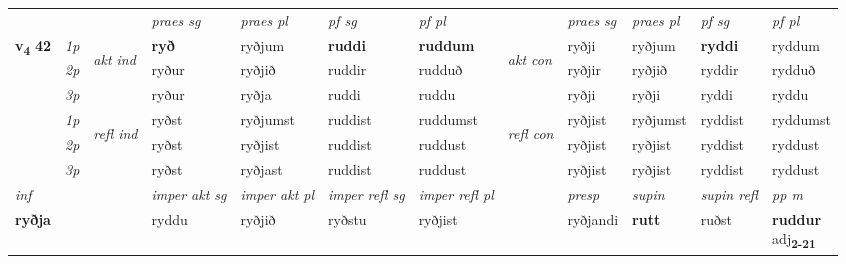 \begin{longtable}[l]{X>{\footnotesize\itshape}llXXXXlXXXX}
\midrule
 & &   & \textit{praes sg}  & \textit{praes pl}    & \textit{ pf sg} & \textit{pf pl} & & \textit{praes sg}  & \textit{praes pl}    & \textit{pf sg} & \textit{pf pl }  \\ \cmidrule{4-7} \cmidrule{9-12}
 \multirow{2}{*}{{{\textbf{v{\textsubscript{4}}} \Large{\textbf{42}}}}}  & 1p & \multirow{3}{*}{\begin{turn}{90}\textit{akt ind}\end{turn}} & \textbf{ryð} & ryðjum & \textbf{ruddi} & \textbf{ruddum} & \multirow{3}{*}{\begin{turn}{90}\textit{akt con}\end{turn}} &ryðji & ryðjum & \textbf{ryddi} & ryddum\\*
 & 2p &  &  ryður  & ryðjið & ruddir & rudduð & & ryðjir & ryðjið & ryddir & rydduð \\*
 & 3p &  & ryður & ryðja & ruddi & ruddu & & ryðji & ryðji& ryddi & ryddu \\*
\cmidrule{4-7} \cmidrule{9-12}
 & 1p & \multirow{3}{*}{\begin{turn}{90}\textit{refl ind}\end{turn}}  & ryðst & ryðjumst & ruddist & ruddumst & \multirow{3}{*}{\begin{turn}{90}\textit{refl con}\end{turn}}  &ryðjist & ryðjumst & ryddist & ryddumst \\*
 & 2p &  & ryðst & ryðjist & ruddist & ruddust & &ryðjist & ryðjist & ryddist & ryddust \\*
 & 3p  & & ryðst & ryðjast & ruddist & ruddust & & ryðjist & ryðjist& ryddist & ryddust \\*
\cmidrule{4-7} \cmidrule{9-12}

   {\textit{inf}} & &  & \textit{imper akt sg} & \textit{imper akt pl} & \textit{imper refl sg} & \textit{imper refl pl} && \textit{presp} & \textit{supin} & \textit{supin refl} & \textit{pp m} \\*
  {\textbf{ryðja}} & && ryddu  & ryðjið & ryðstu & ryðjist && ryðjandi &  \textbf{rutt} & ruðst & \specialcell{\textbf{ruddur} \\ adj\textbf{\textsubscript{2-21}}} \\*

\midrule


\end{longtable}

